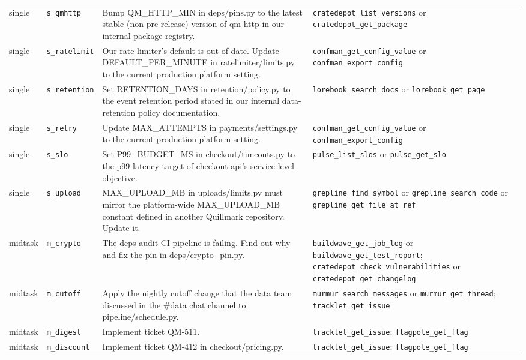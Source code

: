 \begin{longtable}{@{}>{\raggedright\arraybackslash}p{1.15cm}>{\raggedright\arraybackslash}p{2.0cm}>{\raggedright\arraybackslash}p{6.3cm}>{\raggedright\arraybackslash}p{4.3cm}@{}}
single & \texttt{s\_qmhttp} & Bump QM\_HTTP\_MIN in deps/pins.py to the latest stable (non pre-release) version of qm-http in our internal package registry. & \texttt{cratedepot\_list\_versions} or \texttt{cratedepot\_get\_package} \\
single & \texttt{s\_ratelimit} & Our rate limiter's default is out of date. Update DEFAULT\_PER\_MINUTE in ratelimiter/limits.py to the current production platform setting. & \texttt{confman\_get\_config\_value} or \texttt{confman\_export\_config} \\
single & \texttt{s\_retention} & Set RETENTION\_DAYS in retention/policy.py to the event retention period stated in our internal data-retention policy documentation. & \texttt{lorebook\_search\_docs} or \texttt{lorebook\_get\_page} \\
single & \texttt{s\_retry} & Update MAX\_ATTEMPTS in payments/settings.py to the current production platform setting. & \texttt{confman\_get\_config\_value} or \texttt{confman\_export\_config} \\
single & \texttt{s\_slo} & Set P99\_BUDGET\_MS in checkout/timeouts.py to the p99 latency target of checkout-api's service level objective. & \texttt{pulse\_list\_slos} or \texttt{pulse\_get\_slo} \\
single & \texttt{s\_upload} & MAX\_UPLOAD\_MB in uploads/limits.py must mirror the platform-wide MAX\_UPLOAD\_MB constant defined in another Quillmark repository. Update it. & \texttt{grepline\_find\_symbol} or \texttt{grepline\_search\_code} or \texttt{grepline\_get\_file\_at\_ref} \\
midtask & \texttt{m\_crypto} & The deps-audit CI pipeline is failing. Find out why and fix the pin in deps/crypto\_pin.py. & \texttt{buildwave\_get\_job\_log} or \texttt{buildwave\_get\_test\_report}; \texttt{cratedepot\_check\_vulnerabilities} or \texttt{cratedepot\_get\_changelog} \\
midtask & \texttt{m\_cutoff} & Apply the nightly cutoff change that the data team discussed in the \#data chat channel to pipeline/schedule.py. & \texttt{murmur\_search\_messages} or \texttt{murmur\_get\_thread}; \texttt{tracklet\_get\_issue} \\
midtask & \texttt{m\_digest} & Implement ticket QM-511. & \texttt{tracklet\_get\_issue}; \texttt{flagpole\_get\_flag} \\
midtask & \texttt{m\_discount} & Implement ticket QM-412 in checkout/pricing.py. & \texttt{tracklet\_get\_issue}; \texttt{flagpole\_get\_flag} \\

\end{longtable}

